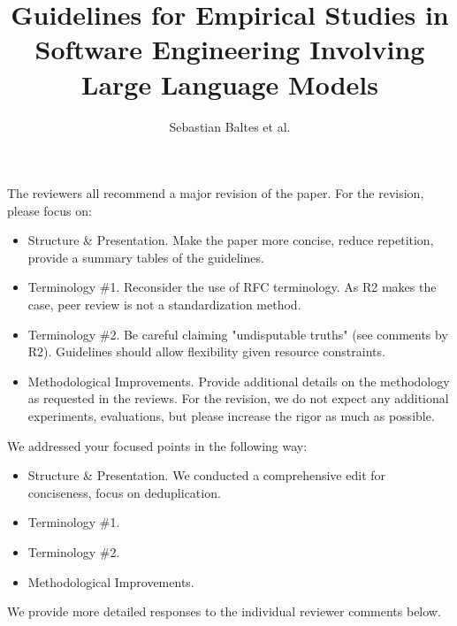 \documentclass[12pt,english]{reviewresponse}
\title{Guidelines for Empirical Studies in Software Engineering Involving Large Language Models}
\author{Sebastian Baltes et al.}
\begin{document}
\maketitle



\editor
\begin{generalcomment}
The reviewers all recommend a major revision of the paper. For the revision, please focus on:

\begin{itemize}
    \item Structure \& Presentation. Make the paper more concise, reduce repetition, provide a summary tables of the guidelines.
    \item Terminology \#1. Reconsider the use of RFC terminology. As R2 makes the case, peer review is not a standardization method.
    \item Terminology \#2. Be careful claiming "undisputable truths" (see comments by R2). Guidelines should allow flexibility given resource constraints.
    \item Methodological Improvements. Provide additional details on the methodology as requested in the reviews. For the revision, we do not expect any additional experiments, evaluations, but please increase the rigor as much as possible.
\end{itemize}

\end{generalcomment}

\begin{revresponse}
We addressed your focused points in the following way:

\begin{itemize}
    \item Structure \& Presentation. We conducted a comprehensive edit for conciseness, focus on deduplication. %
    \item Terminology \#1. 
    \item Terminology \#2. 
    \item Methodological Improvements. 
\end{itemize}


We provide more detailed responses to the individual reviewer comments below.
\end{revresponse}
\end{document}
